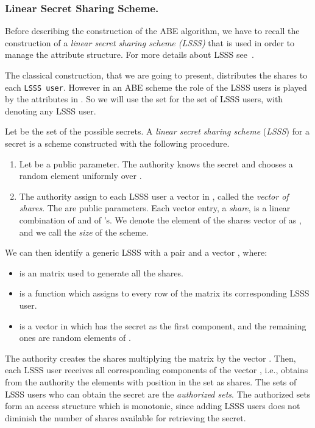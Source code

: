 \documentclass[a4paper,10pt]{article}
\begin{document}
\subsubsection{Linear Secret Sharing Scheme.}	
Before describing the construction of the ABE algorithm, we have to recall the construction of a \emph{linear secret sharing scheme (LSSS)} that is used in order to manage the attribute structure. For more details about LSSS see~\cite{beimel1996SSS}.
\label{LSSS_def}

	The classical construction, that we are going to present, distributes the shares to each \texttt{LSSS user}. However in an ABE scheme the role of the LSSS users is played by the attributes in . So we will use the set  for the set of LSSS users, with  denoting any LSSS user.

		Let  be the set of the possible secrets. A \emph{linear secret sharing scheme}  (\emph{LSSS}) for a secret  is a scheme constructed with the following procedure. 
		\begin{enumerate}
			\item
			Let  be a public parameter. The authority knows the secret  and chooses a random element  uniformly over . 
			\item
			 The authority assign to each LSSS user    a vector in , called the \emph{vector of shares}. The  are  public parameters.  Each vector entry, a \emph{share}, is a linear combination of  and of 's.
\noindent We denote the  element of the shares vector of  as , and we call  the \emph{size} of the scheme.
		\end{enumerate}
	We can then identify a generic LSSS with a pair  and a vector , where:
	
	\begin{itemize}
		\item
		 is an  matrix used to generate all the shares.
		\item
		 is a function which assigns to every row of the matrix its corresponding LSSS user.
		\item
		 is a vector in  which has the secret as the first component, and the remaining ones are random elements of .
	\end{itemize}
The authority creates the shares multiplying the matrix  by the vector . Then, each LSSS user  receives all  corresponding components of the vector , i.e.,  obtains from the authority the elements with position in the set  as shares. The sets of LSSS users who can obtain the secret are the \emph{authorized sets}. The authorized sets form an access structure  which is monotonic, since adding LSSS users does not diminish the number of shares available for retrieving the secret.
\end{document}
